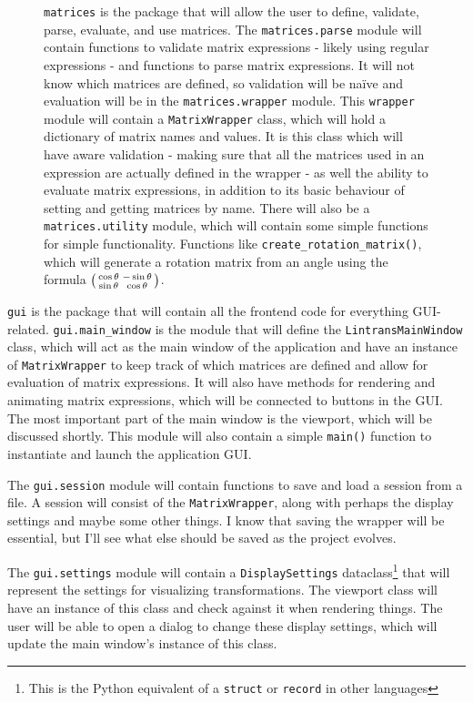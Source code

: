 \documentclass[../main.tex]{subfiles}
\begin{document}
\begin{figure}[H]
\begin{minipage}{0.55\linewidth}
\texttt{matrices} is the package that will allow the user to define, validate, parse, evaluate, and use matrices. The \texttt{matrices.parse} module will contain functions to validate matrix expressions - likely using regular expressions - and functions to parse matrix expressions. It will not know which matrices are defined, so validation will be na\"{i}ve and evaluation will be in the \texttt{matrices.wrapper} module. This \texttt{wrapper} module will contain a \texttt{MatrixWrapper} class, which will hold a dictionary of matrix names and values. It is this class which will have aware validation - making sure that all the matrices used in an expression are actually defined in the wrapper - as well the ability to evaluate matrix expressions, in addition to its basic behaviour of setting and getting matrices by name. There will also be a \texttt{matrices.utility} module, which will contain some simple functions for simple functionality. Functions like \texttt{create\_rotation\_matrix()}, which will generate a rotation matrix from an angle using the formula $\begin{psmallmatrix}\cos\theta & -\sin\theta\\\sin\theta & \cos\theta\end{psmallmatrix}$.
\end{minipage}
\end{figure}

\texttt{gui} is the package that will contain all the frontend code for everything GUI-related. \texttt{gui.main\_window} is the module that will define the \texttt{LintransMainWindow} class, which will act as the main window of the application and have an instance of \texttt{MatrixWrapper} to keep track of which matrices are defined and allow for evaluation of matrix expressions. It will also have methods for rendering and animating matrix expressions, which will be connected to buttons in the GUI. The most important part of the main window is the viewport, which will be discussed shortly. This module will also contain a simple \texttt{main()} function to instantiate and launch the application GUI.

The \texttt{gui.session} module will contain functions to save and load a session from a file. A session will consist of the \texttt{MatrixWrapper}, along with perhaps the display settings and maybe some other things. I know that saving the wrapper will be essential, but I'll see what else should be saved as the project evolves.

The \texttt{gui.settings} module will contain a \texttt{DisplaySettings} dataclass\footnote{This is the Python equivalent of a \texttt{struct} or \texttt{record} in other languages} that will represent the settings for visualizing transformations. The viewport class will have an instance of this class and check against it when rendering things. The user will be able to open a dialog to change these display settings, which will update the main window's instance of this class.
\end{document}
